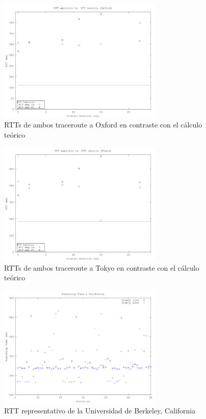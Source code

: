 \begin{figure}[h!]
  \centering
  \includegraphics[width=0.7\textwidth]{./figs/rtt_emp_vs_teo_oxford.png}
  \caption{RTTs de ambos traceroute a Oxford en contraste con el cálculo teórico}
  \label{fig:emp_vs_teo_ox}
\end{figure}

\begin{figure}[h!]
  \centering
  \includegraphics[width=0.7\textwidth]{./figs/rtt_emp_vs_teo_tokyo.png}
  \caption{RTTs de ambos traceroute a Tokyo en contraste con el cálculo teórico}
  \label{fig:emp_vs_teo_tok}
\end{figure}

\begin{figure}[h!]
  \centering
  \includegraphics[width=0.7\textwidth]{./figs/rtt_horarios_california.png}
  \caption{RTT representativo de la Universidad de Berkeley, California}
  \label{fig:rtt-horarios-california}
\end{figure}

